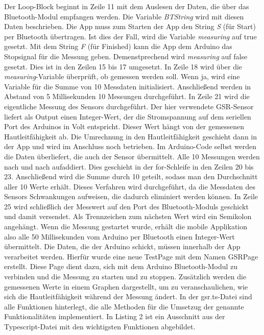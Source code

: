Der Loop-Block beginnt in Zeile 11 mit dem Auslesen der Daten, die über das Bluetooth-Modul empfangen werden. Die Variable \textit{BTString} wird mit diesen Daten beschrieben. Die App muss zum Starten der App den String \textit{S} (für Start) per Bluetooth übertragen. Ist dies der Fall, wird die Variable \textit{measuring} auf true gesetzt. Mit dem String \textit{F} (für Finished) kann die App dem Arduino das Stopsignal für die Messung geben. Demenstprechend wird \textit{measuring} auf false gesetzt. Dies ist in den Zeilen 15 bis 17 umgesetzt. \newline
In Zeile 18 wird über die \textit{measuring}-Variable überprüft, ob gemessen werden soll. Wenn ja, wird eine Variable für die Summe von 10 Messdaten initialisiert. Anschließend werden in Abstand von 5 Millisekunden 10 Messungen durchgeführt. In Zeile 21 wird die eigentliche Messung des Sensors durchgeführt. Der hier verwendete GSR-Sensor liefert als Output einen Integer-Wert, der die Stromspannung auf dem seriellen Port des Arduinos in Volt entspricht. Dieser Wert hängt von der gemessenen Hautleitfähigkeit ab. Die Umrechnung in den Hautleitfähigkeit geschieht dann in der App und wird im Anschluss noch betrieben. Im Arduino-Code selbst werden die Daten überliefert, die auch der Sensor übermittelt. Alle 10 Messungen werden nach und nach aufaddiert. Dies geschieht in der for-Schleife in den Zeilen 20 bis 23. Anschließend wird die Summe durch 10 geteilt, sodass man den Durchschnitt aller 10 Werte erhält. Dieses Verfahren wird durchgeführt, da die Messdaten des Sensors Schwankungen aufweisen, die dadurch eliminiert werden können. In Zeile 25 wird schließlich der Messwert auf den Port des Bluetooth-Moduls geschickt und damit versendet. Als Trennzeichen zum nächsten Wert wird ein Semikolon angehängt. \newline
Wenn die Messung gestartet wurde, erhält die mobile Applikation also alle 50 Millisekunden vom Arduino per Bluetooth einen Integer-Wert übermittelt. \newline
Die Daten, die der Arduino schickt, müssen innerhalb der App verarbeitet werden. Hierfür wurde eine neue TestPage mit dem Namen GSRPage erstellt. Diese Page dient dazu, sich mit dem Arduino Bluetooth-Modul zu verbinden und die Messung zu starten und zu stoppen. Zusätzlich werden die gemessenen Werte in einem Graphen dargestellt, um zu veranschaulichen, wie sich die Hautleitfähigkeit während der Messung ändert. \newline \newline
In der gsr.ts-Datei sind alle Funktionen hinterlegt, die alle Methoden für die Umsetzug der genannte Funktionalitäten implementiert. In Listing 2 ist ein Ausschnitt aus der Typescript-Datei mit den wichtigsten Funktionen abgebildet. \newline

